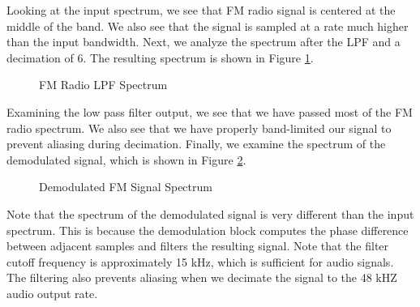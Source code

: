 \documentclass{article}
\begin{document}
\noindent Looking at the input spectrum, we see that FM radio signal is centered at the middle of the band. We also see that the signal is sampled at a rate much higher than the input bandwidth. Next, we analyze the spectrum after the LPF and a decimation of 6. The resulting spectrum is shown in Figure \ref{fig::fm_radio_lpf_spectrum}.

\begin{figure}[H]
	\centerline{}
	\caption{FM Radio LPF Spectrum}
	\label{fig::fm_radio_lpf_spectrum}
\end{figure}

\noindent Examining the low pass filter output, we see that we have passed most of the FM radio spectrum. We also see that we have properly band-limited our signal to prevent aliasing during decimation. Finally, we examine the spectrum of the demodulated signal, which is shown in Figure \ref{fig::fm_radio_demod_spectrum}.

\begin{figure}[H]
	\centerline{}
	\caption{Demodulated FM Signal Spectrum}
	\label{fig::fm_radio_demod_spectrum}
\end{figure}

\noindent Note that the spectrum of the demodulated signal is very different than the input spectrum. This is because the demodulation block computes the phase difference between adjacent samples and filters the resulting signal. Note that the filter cutoff frequency is approximately 15 kHz, which is sufficient for audio signals. The filtering also prevents aliasing when we decimate the signal to the 48 kHZ audio output rate.
\end{document}

